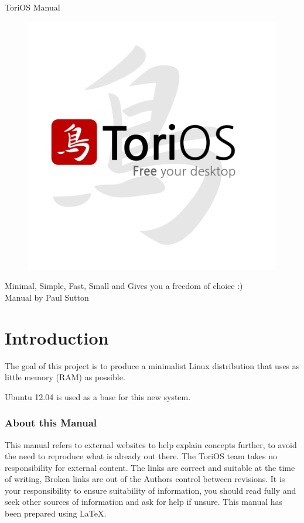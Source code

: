 \documentclass[12pt,a4paper]{book}
\author{Paul Sutton}
\begin{document}
\begin{center}
{\Huge ToriOS Manual}
\end{center}



\begin{figure}
\centering
\includegraphics[width=0.7\linewidth]{./FinalLogo}

\end{figure}


\begin{center}
Minimal, Simple, Fast, Small and Gives you a freedom of choice :) \\
Manual by Paul Sutton
\end{center}

\tableofcontents
{}
\chapter{Introduction}
The goal of this project is to produce a minimalist Linux distribution that uses as little memory (RAM) as possible.



Ubuntu 12.04 is used as a base for this new system.
\subsection{About this Manual}
This manual refers to external websites to help explain concepts further, to avoid the need to reproduce what is already out there.  The ToriOS team takes no responsibility for external content.  The links are correct and suitable at the time of writing,  Broken links are out of the Authors control between revisions.  It is your responsibility to ensure suitability of information, you should read fully and seek other sources of information and ask for help if unsure.  
This manual has been prepared using \LaTeX.
\end{document}
